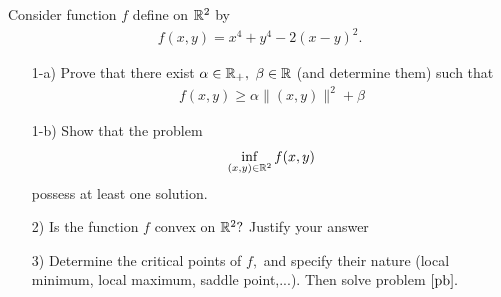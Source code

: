 \documentclass{ExerciseSheet}
\newif\ifsolutions
\begin{document}
\fi





\vskip 0.5cm

\begin{exo}
Consider function $f$ define on $\mathbb{R}^2$ by
  \begin{align*}
      f(x, y) = x^4 + y^4 -2(x - y)^2.
  \end{align*}
  \begin{enumerate}
      \item [1-a)] Prove that there exist $\alpha\in \mathbb{R}_+,$ $\beta\in \mathbb{R}$ (and determine them) such that
      \begin{align*}
          f(x,y)\geq \alpha\|(x,y)\|^2 + \beta
      \end{align*}
    \item [1-b)] Show that the problem 
        \begin{align} \label{pb}
            \inf_{(x,y)\in \mathbb{R}^2} f(x,y)
        \end{align}
    possess at least one solution.
    
    \item [2)] Is the function $f$ convex on $\mathbb{R}^2?$ Justify your answer
    \item [3)] Determine the critical points of $f,$ and specify their nature (local minimum, local maximum, saddle point,...). Then solve problem $\eqref{pb}.$
    
  \end{enumerate}

  
\end{exo}
\end{document}
